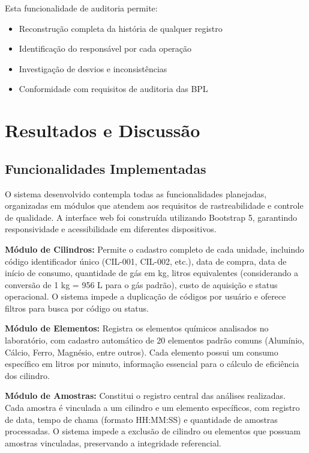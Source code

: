 \documentclass[12pt,a4paper]{article}
\providecommand\关键字[1]{\textbf{#1}}
\begin{document}
Esta funcionalidade de auditoria permite:
\begin{itemize}
\item Reconstrução completa da história de qualquer registro
\item Identificação do responsável por cada operação
\item Investigação de desvios e inconsistências
\item Conformidade com requisitos de auditoria das BPL
\end{itemize}

\section{Resultados e Discussão}

\subsection{Funcionalidades Implementadas}

O sistema desenvolvido contempla todas as funcionalidades planejadas, organizadas em módulos que atendem aos requisitos de rastreabilidade e controle de qualidade. A interface web foi construída utilizando Bootstrap 5, garantindo responsividade e acessibilidade em diferentes dispositivos.

\textbf{Módulo de Cilindros:} Permite o cadastro completo de cada unidade, incluindo código identificador único (CIL-001, CIL-002, etc.), data de compra, data de início de consumo, quantidade de gás em kg, litros equivalentes (considerando a conversão de 1 kg = 956 L para o gás padrão), custo de aquisição e status operacional. O sistema impede a duplicação de códigos por usuário e oferece filtros para busca por código ou status.

\textbf{Módulo de Elementos:} Registra os elementos químicos analisados no laboratório, com cadastro automático de 20 elementos padrão comuns (Alumínio, Cálcio, Ferro, Magnésio, entre outros). Cada elemento possui um consumo específico em litros por minuto, informação essencial para o cálculo de eficiência dos cilindro.

\textbf{Módulo de Amostras:} Constitui o registro central das análises realizadas. Cada amostra é vinculada a um cilindro e um elemento específicos, com registro de data, tempo de chama (formato HH:MM:SS) e quantidade de amostras processadas. O sistema impede a exclusão de cilindro ou elementos que possuam amostras vinculadas, preservando a integridade referencial.
\end{document}
